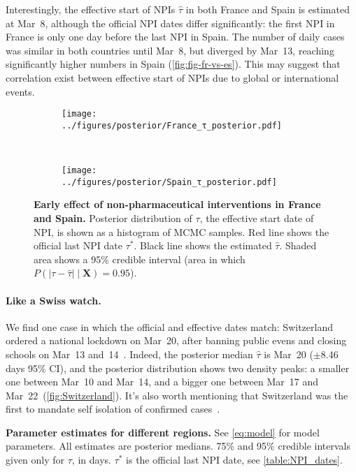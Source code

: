 \documentclass[12pt]{extarticle}
\let\vec\mathbf
\begin{document}
Interestingly, the effective start of NPIs $\hat{\tau}$ in both France and Spain is estimated at Mar~8, although the official NPI dates differ significantly: the first NPI in France is only one day before the last NPI in Spain.
The number of daily cases was similar in both countries until Mar~8, but diverged by Mar~13, reaching significantly higher numbers in Spain (\autoref{fig:fig-fr-vs-es}).
This may suggest that correlation exist between effective start of NPIs due to global or international events.



\begin{figure}[h]
    \centering
    \begin{subfigure}{0.45\textwidth}
        \texttt{[image: ../figures/posterior/France\_τ\_posterior.pdf]}
    \end{subfigure}
    ~
    \begin{subfigure}{0.45\textwidth}
        \texttt{[image: ../figures/posterior/Spain\_τ\_posterior.pdf]}
    \end{subfigure}
    \caption{
    \textbf{Early effect of non-pharmaceutical interventions in France and Spain.}
    Posterior distribution of $\tau$, the effective start date of NPI, is shown as a histogram of MCMC samples. Red line shows the official last NPI date $\tau^*$. Black line shows the estimated $\hat{\tau}$. Shaded area shows a 95\% credible interval (area in which $P(|\tau - \hat{\tau}| \mid \vec{X}) = 0.95$). 
	}
	\label{fig:early}
\end{figure}


\paragraph*{Like a Swiss watch.}
We find one case in which the official and effective dates match: Switzerland ordered a national lockdown on Mar~20, after banning public evens and closing schools on Mar~13 and~14~\citep{Flaxman2020}.
Indeed, the posterior median $\hat{\tau}$ is Mar~20 ($\pm$8.46 days 95\% CI), and the posterior distribution shows two density peaks: a smaller one between Mar~10 and Mar~14, and a bigger one between Mar~17 and Mar~22~(\autoref{fig:Switzerland}). It's also worth mentioning that Switzerland was the first to mandate self isolation of confirmed cases~\citep{Flaxman2020}.



\begin{landscape}
\begin{table}[h]
\centering

\caption{
\textbf{Parameter estimates for different regions.}
See \autoref{eq:model} for model parameters.
All estimates are posterior medians.
75\% and 95\% credible intervals given only for $\tau$, in days.
$\tau^*$ is the official last NPI date, see \autoref{table:NPI_dates}.
}
\label{table:estimated-params}
\end{table}
\end{landscape}
\end{document}
